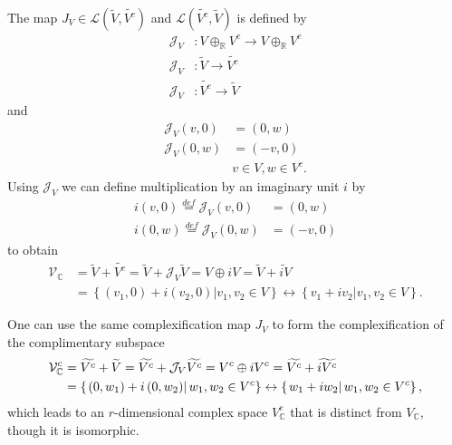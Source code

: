 \documentclass[aps,preprint]{revtex4}
\begin{document}
The map $J_{V}\in\mathcal{L}\left( \widetilde{V},\widetilde{V^{c}}\right) $
and $\mathcal{L}\left( \widetilde{V^{c}},\widetilde{V}\right) $ is defined
by 
\begin{align}
\mathcal{J}_{V} & :V\oplus_{\mathbb{R}}V^{c}\rightarrow V\oplus_{\mathbb{R}%
}V^{c} \\
\mathcal{J}_{V} & :\widetilde{V}\rightarrow\widetilde{V^{c}} \\
\mathcal{J}_{V} & :\widetilde{V^{c}}\rightarrow\widetilde{V}
\end{align}
and%
\begin{align}
\mathcal{J}_{V}\left( v,0\right) & =\left( 0,w\right) \\
\mathcal{J}_{V}\left( 0,w\right) & =\left( -v,0\right) \\
& v\in V,w\in V^{c}.
\end{align}
Using $\mathcal{J}_{V}$ we can define multiplication by an imaginary unit $i$
by 
\begin{align}
i\left( v,0\right) \overset{def}{=}\mathcal{J}_{V}\left( v,0\right) &
=\left( 0,w\right) \\
i\left( 0,w\right) \overset{def}{=}\mathcal{J}_{V}\left( 0,w\right) &
=\left( -v,0\right)
\end{align}
to obtain%
\begin{align}
\mathcal{V}_{\mathbb{C}} & =\widetilde{V}+\widetilde{V^{c}}=\widetilde{V}+%
\mathcal{J}_{V}\widetilde{V}=V\oplus iV=\widetilde{V}+\widetilde{iV} \\
& =\left\{ \left. \left( v_{1},0\right) +i\left( v_{2},0\right) \right\vert
v_{1},v_{2}\in V\right\} \leftrightarrow\left\{ \left.
v_{1}+iv_{2}\right\vert v_{1},v_{2}\in V\right\} .
\end{align}

One can use the same complexification map $J_{V}$ to form the
complexification of the complimentary subspace 
\begin{align}
\mathcal{V}_{\mathbb{C}}^{c} & =\widetilde{V^{c}}+\widetilde{V}=\widetilde{%
V^{c}}+\mathcal{J}_{V}\widetilde{V^{c}}=V^{c}\oplus iV^{c}=\widetilde{V^{c}}+%
\widetilde{iV^{c}} \\
& =\left\{ \left. \left( 0,w_{1}\right) +i\left( 0,w_{2}\right) \right\vert
w_{1},w_{2}\in V^{c}\right\} \leftrightarrow\left\{ \left.
w_{1}+iw_{2}\right\vert w_{1},w_{2}\in V^{c}\right\} ,
\end{align}
which leads to an $r$-dimensional complex space $V_{\mathbb{C}}^{c}$ that is
distinct from $V_{\mathbb{C}}$, though it is isomorphic.
\end{document}

